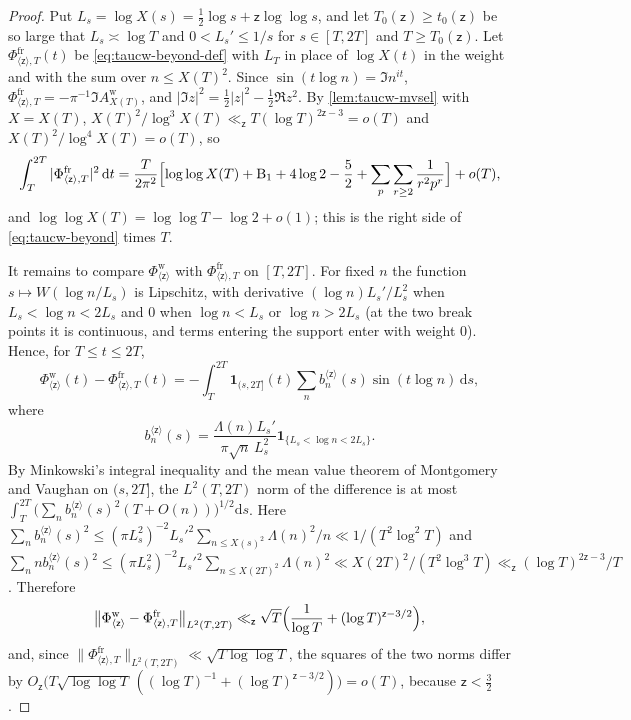\documentclass[11pt,a4paper]{article}
\numberwithin{equation}{section}
\theoremstyle{definition}
\theoremstyle{remark}
\newcommand{\dd}{\,\mathrm dt}
\begin{document}
\begin{proof}
Put $L_s=\log X(s)=\frac12\log s+\mathsf z\log\log s$, and let $T_0(\mathsf z)\ge t_0(\mathsf z)$ be so large that $L_s\asymp\log T$ and $0<L_s'\le1/s$ for $s\in[T,2T]$ and $T\ge T_0(\mathsf z)$. Let $\Phi^{\mathrm{fr}}_{\langle\mathsf z\rangle,T}(t)$ be \eqref{eq:taucw-beyond-def} with $L_T$ in place of $\log X(t)$ in the weight and with the sum over $n\le X(T)^2$. Since $\sin(t\log n)=\Im n^{it}$, $\Phi^{\mathrm{fr}}_{\langle\mathsf z\rangle,T}=-\pi^{-1}\Im A^{\mathrm w}_{X(T)}$, and $|\Im z|^2=\frac12|z|^2-\frac12\Re z^2$. By \cref{lem:taucw-mvsel} with $X=X(T)$, $X(T)^2/\log^3X(T)\ll_{\mathsf z}T(\log T)^{2\mathsf z-3}=o(T)$ and $X(T)^2/\log^4X(T)=o(T)$, so
\begin{equation}
\int_T^{2T}|\Phi^{\mathrm{fr}}_{\langle\mathsf z\rangle,T}|^2\dd=\frac T{2\pi^2}\Bigl[\log\log X(T)+\mathrm B_1+4\log2-\frac52+\sum_p\sum_{r\ge2}\frac1{r^2p^r}\Bigr]+o(T),
\end{equation}
and $\log\log X(T)=\log\log T-\log2+o(1)$; this is the right side of \eqref{eq:taucw-beyond} times $T$.

It remains to compare $\Phi^{\mathrm w}_{\langle\mathsf z\rangle}$ with $\Phi^{\mathrm{fr}}_{\langle\mathsf z\rangle,T}$ on $[T,2T]$. For fixed $n$ the function $s\mapsto W(\log n/L_s)$ is Lipschitz, with derivative $(\log n)L_s'/L_s^2$ when $L_s<\log n<2L_s$ and $0$ when $\log n<L_s$ or $\log n>2L_s$ (at the two break points it is continuous, and terms entering the support enter with weight $0$). Hence, for $T\le t\le2T$,
\begin{equation}
\Phi^{\mathrm w}_{\langle\mathsf z\rangle}(t)-\Phi^{\mathrm{fr}}_{\langle\mathsf z\rangle,T}(t)=-\int_T^{2T}\mathbf 1_{(s,2T]}(t)\sum_{n}b^{\langle\mathsf z\rangle}_n(s)\sin(t\log n)\,\mathrm ds,
\end{equation}
where
\begin{equation}
b^{\langle\mathsf z\rangle}_n(s)=\frac{\Lambda(n)L_s'}{\pi\sqrt n\,L_s^2}\mathbf 1_{\{L_s<\log n<2L_s\}} .
\end{equation}
By Minkowski's integral inequality and the mean value theorem of Montgomery and Vaughan on $(s,2T]$, the $L^2(T,2T)$ norm of the difference is at most $\int_T^{2T}\bigl(\sum_nb^{\langle\mathsf z\rangle}_n(s)^2(T+O(n))\bigr)^{1/2}\mathrm ds$. Here $\sum_nb^{\langle\mathsf z\rangle}_n(s)^2\le(\pi L_s^2)^{-2}L_s'^2\sum_{n\le X(s)^2}\Lambda(n)^2/n\ll1/(T^2\log^2T)$ and $\sum_nnb^{\langle\mathsf z\rangle}_n(s)^2\le(\pi L_s^2)^{-2}L_s'^2\sum_{n\le X(2T)^2}\Lambda(n)^2\ll X(2T)^2/(T^2\log^3T)\ll_{\mathsf z}(\log T)^{2\mathsf z-3}/T$. Therefore
\begin{equation}
\bigl\|\Phi^{\mathrm w}_{\langle\mathsf z\rangle}-\Phi^{\mathrm{fr}}_{\langle\mathsf z\rangle,T}\bigr\|_{L^2(T,2T)}\ll_{\mathsf z}\sqrt T\Bigl(\frac1{\log T}+(\log T)^{\mathsf z-3/2}\Bigr),
\end{equation}
and, since $\|\Phi^{\mathrm{fr}}_{\langle\mathsf z\rangle,T}\|_{L^2(T,2T)}\ll\sqrt{T\log\log T}$, the squares of the two norms differ by $O_{\mathsf z}\bigl(T\sqrt{\log\log T}\,((\log T)^{-1}+(\log T)^{\mathsf z-3/2})\bigr)=o(T)$, because $\mathsf z<\frac32$.
\end{proof}
\end{document}
